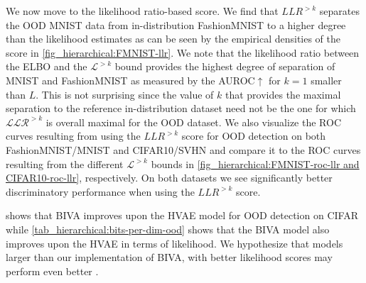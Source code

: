 {We now move to the likelihood ratio-based score.
We find that $LLR^{>k}$ separates the OOD MNIST data from in-distribution FashionMNIST to a higher degree than the likelihood estimates as can be seen by the empirical densities of the score in \cref{fig_hierarchical:FMNIST-llr}.
We note that the likelihood ratio between the ELBO and the $\mathcal{L}^{>k}$ bound provides the highest degree of separation of MNIST and FashionMNIST as measured by the AUROC$\uparrow$ for $k=1$ smaller than $L$.
This is not surprising since the value of $k$ that provides the maximal separation to the reference in-distribution dataset need not be the one for which $\mathcal{LLR}^{>k}$ is overall maximal for the OOD dataset.
We also visualize the ROC curves resulting from using the $LLR^{>k}$ score for OOD detection on both FashionMNIST/MNIST and CIFAR10/SVHN and compare it to the ROC curves resulting from the different $\mathcal{L}^{>k}$ bounds in \cref{fig_hierarchical:FMNIST-roc-llr and CIFAR10-roc-llr}, respectively.
On both datasets we see significantly better discriminatory performance when using the $LLR^{>k}$ score.

 shows that BIVA improves upon the HVAE model for OOD detection on CIFAR while \cref{tab_hierarchical:bits-per-dim-ood} shows that the BIVA model also improves upon the HVAE in terms of likelihood.
We hypothesize that models larger than our implementation of BIVA, with better likelihood scores may perform even better \parencite{maaloe_biva_2019, vahdat_nvae_2020, child_very_2021}.

}
